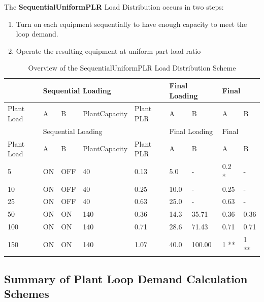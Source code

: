 The \textbf{SequentialUniformPLR} Load Distribution occurs in two steps:

\begin{enumerate}
    \def\labelenumi{Step \arabic{enumi}:}
\item
    Turn on each equipment sequentially to have enough capacity to meet the loop demand.
\item
    Operate the resulting equipment at uniform part load ratio
\end{enumerate}

\begin{longtable}[c]{|l|l|l|l|l|l|l|l|l|}
    \caption{Overview of the SequentialUniformPLR Load Distribution Scheme}
    \label{tab:sequentialuniformplr-load-overview}\\
\hline
 & \multicolumn{4}{l|}{Sequential Loading} & \multicolumn{2}{l|}{Final Loading} & \multicolumn{2}{l|}{Final} \\ \hline
Plant Load & A & B & PlantCapacity & Plant PLR & A & B & A & B \\ \hline
\endfirsthead

\hline
 & \multicolumn{4}{l|}{Sequential Loading} & \multicolumn{2}{l|}{Final Loading} & \multicolumn{2}{l|}{Final} \\ \hline
Plant Load & A & B & PlantCapacity & Plant PLR & A & B & A & B \\ \hline
\endhead

5 & ON & OFF & 40 & 0.13 & 5.0 & - & 0.2 * & - \\ \hline
10 & ON & OFF & 40 & 0.25 & 10.0 & - & 0.25 & - \\ \hline
25 & ON & OFF & 40 & 0.63 & 25.0 & - & 0.63 & - \\ \hline
50 & ON & ON & 140 & 0.36 & 14.3 & 35.71 & 0.36 & 0.36 \\ \hline
100 & ON & ON & 140 & 0.71 & 28.6 & 71.43 & 0.71 & 0.71 \\ \hline
150 & ON & ON & 140 & 1.07 & 40.0 & 100.00 & 1 ** & 1 ** \\ \hline
\end{longtable}



\subsection{Summary of Plant Loop Demand Calculation Schemes}\label{summary-of-plant-loop-demand-calculation-schemes}

